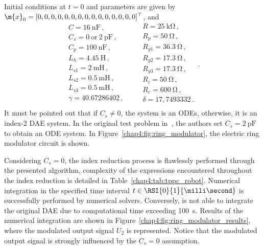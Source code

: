 %
Initial conditions at $t = 0$ and parameters are given by $\m{x}_0 = [0, 0, 0, 0, 0, 0, 0, 0, 0, 0, 0, 0, 0, 0, 0]^\top$, and
%
\begin{equation*}
  \begin{array}{l}
    C = \SI{16}{\nano\farad} \, \text{,} \\
    C_s = 0~\text{or}~\SI{2}{\pico\farad} \, \text{,} \\
    C_p = \SI{100}{\nano\farad} \, \text{,} \\
    L_h = \SI{4.45}{\henry} \, \text{,} \\
    L_{s1} = \SI{2}{\milli\henry} \, \text{,} \\
    L_{s2} = \SI{0.5}{\milli\henry} \, \text{,} \\
    L_{s3} = \SI{0.5}{\milli\henry} \, \text{,} \\
    \gamma = 40.67286402 \, \text{,} \\
  \end{array}
  \qquad
  \begin{array}{l}
    R = \SI{25}{\kilo\ohm} \, \text{,} \\
    R_p = \SI{50}{\ohm} \, \text{,} \\
    R_{g1} = \SI{36.3}{\ohm} \, \text{,} \\
    R_{g2} = \SI{17.3}{\ohm} \, \text{,} \\
    R_{g3} = \SI{17.3}{\ohm} \, \text{,} \\
    R_{i} = \SI{50}{\ohm} \, \text{,} \\
    R_{c} = \SI{600}{\ohm} \, \text{,} \\
    \delta = 17,7493332 \, \text{.} \\
  \end{array} \, \text{.}
\end{equation*}
%
It must be pointed out that if $C_s \neq 0$, the system is an \acp{ODE}, otherwise, it is an index-2 \ac{DAE} system. In the original test problem in~\cite{lioen1998test, mazzia2008test}, the authors set $C_s = \SI{2}{\pico\farad}$ to obtain an \ac{ODE} system. In Figure~\ref{chap4:fig:ring_modulator}, the electric ring modulator circuit is shown.

Considering $C_s = 0$, the index reduction process is flawlessly performed through the presented algorithm, complexity of the expressions encountered throughout the index reduction is detailed in Table~\ref{chap4:tab:tppc_robot}. Numerical integration in the specified time interval $t \in \RSI{0}{1}{\milli\second}$ is successfully performed by \Indigo{} numerical solvers. Conversely, \Maple{} is not able to integrate the original \ac{DAE} due to computational time exceeding \SI{100}{\second}. Results of the numerical integration are shown in Figure~\ref{chap4:fig:ring_modulator_results}, where the modulated output signal $U_2$ is represented. Notice that the modulated output signal is strongly influenced by the $C_s = 0$ assumption.

